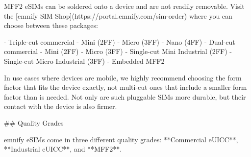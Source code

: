 \documentclass[11pt, oneside]{article}   	%
\newcommand{\addspace}{\vspace{2mm}}
\begin{document}
\begin{markdown}

MFF2 eSIMs can be soldered onto a device and are not readily removable.
Visit the [emnify SIM Shop](https://portal.emnify.com/sim-order) where you can choose between these packages:
\end{markdown}
\addspace
\begin{markdown}
- Triple-cut commercial
    - Mini (2FF)
    - Micro (3FF)
    - Nano (4FF)
- Dual-cut commercial
    - Mini (2FF)
    - Micro (3FF)
- Single-cut Mini Industrial (2FF)
- Single-cut Micro Industrial (3FF)
- Embedded MFF2
\end{markdown}
\addspace
\begin{markdown}
In use cases where devices are mobile, we highly recommend choosing the form factor that fits the device exactly, not multi-cut ones that include a smaller form factor than is needed.
Not only are such pluggable SIMs more durable, but their contact with the device is also firmer.

\end{markdown}
\pagebreak[4]
\begin{markdown}

## Quality Grades

emnify eSIMs come in three different quality grades: **Commercial eUICC**, **Industrial eUICC**, and **MFF2**.
\end{markdown}
\end{document}
